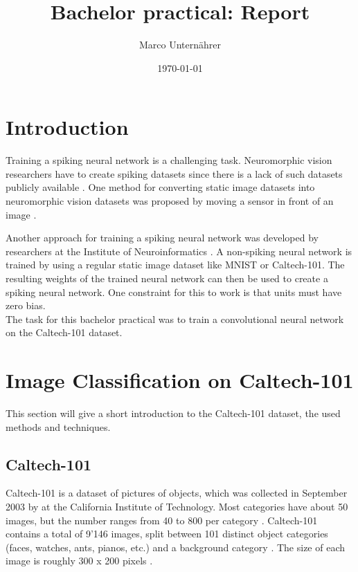 \documentclass[a4paper, 11pt]{article}
\title{Bachelor practical: Report}
\author{Marco Unternährer}
\date{\today}
\begin{document}
\maketitle

\section{Introduction}

Training a spiking neural network is a challenging task.
Neuromorphic vision researchers have to create spiking datasets since there is a lack of such datasets publicly available .
One method for converting static image datasets into neuromorphic vision datasets was proposed by moving a sensor in front of an image \cite{Orchard2015}.

Another approach for training a spiking neural network was developed by researchers at the Institute of Neuroinformatics \cite{Diehl2015}.
A non-spiking neural network is trained by using a regular static image dataset like MNIST or Caltech-101.
The resulting weights of the trained neural network can then be used to create a spiking neural network.
One constraint for this to work is that units must have zero bias.\\

The task for this bachelor practical was to train a convolutional neural network on the Caltech-101 dataset.



\section{Image Classification on Caltech-101}
This section will give a short introduction to the Caltech-101 dataset, the used methods and techniques.

\subsection{Caltech-101} \label{sec:caltech101}
Caltech-101 is a dataset of pictures of objects, which was collected in September 2003 by \citet{Fei-Fei2007} at the California Institute of Technology.
Most categories have about 50 images, but the number ranges from 40 to 800 per category \cite{Fei-Fei2007}.
Caltech-101 contains a total of 9'146 images, split between 101 distinct object categories (faces, watches, ants, pianos, etc.) and a background category \cite{Caltech101Wiki}.
The size of each image is roughly 300 x 200 pixels \cite{Fei-Fei2007}.
\end{document}
